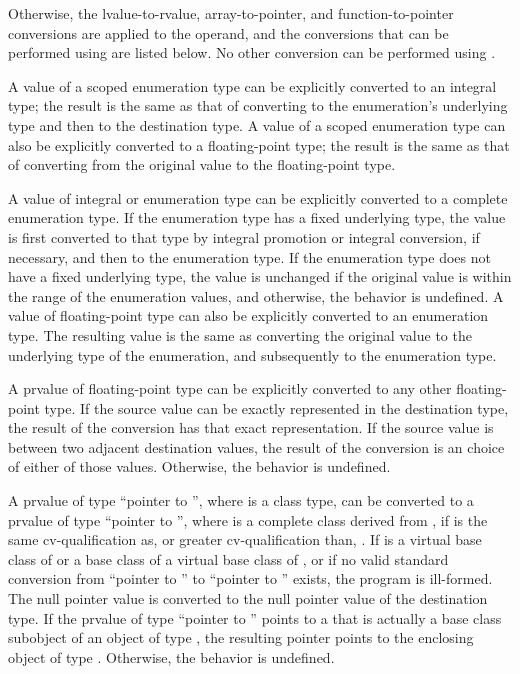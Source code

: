 \pnum
Otherwise, the lvalue-to-rvalue,
array-to-pointer, and
function-to-pointer conversions are applied to the
operand, and the conversions that can be performed using  are listed below.
No other conversion can be performed using .

\pnum
A value of a scoped enumeration type
can be explicitly converted to an integral type;
the result is the same as that of converting
to the enumeration's underlying type and then to the destination type.
A value of a scoped enumeration type
can also be explicitly converted to a floating-point type;
the result is the same as that of converting
from the original value to the floating-point type.

\pnum
{}%
%
A value of integral or enumeration type can be explicitly converted to
a complete enumeration type.
If the enumeration type has a fixed underlying type,
the value is first converted to that type
by
integral promotion or integral conversion,
if necessary, and
then to the enumeration type.
If the enumeration type does not have a fixed underlying type,
the value is unchanged
if the original value is within the range
of the enumeration values, and
otherwise, the behavior is undefined.
A value of floating-point type can also be explicitly converted to an enumeration type.
The resulting value is the same as converting the original value to the
underlying type of the enumeration, and subsequently to
the enumeration type.

\pnum
A prvalue of floating-point type can be explicitly converted to
any other floating-point type.
If the source value can be exactly represented in the destination type,
the result of the conversion has that exact representation.
If the source value is between two adjacent destination values,
the result of the conversion is
an  choice of
either of those values.
Otherwise, the behavior is undefined.

\pnum
{}%
%
A prvalue of type ``pointer to  '', where 
is a class type, can be converted to a prvalue of type ``pointer to
 '',
where  is a complete class derived
from ,
if  is the same cv-qualification as,
or greater cv-qualification than, .
If  is a virtual base class of  or
a base class of a virtual base class of , or
if no valid standard conversion from ``pointer to ''
to ``pointer to '' exists, the program is ill-formed.
The null pointer value is converted
to the null pointer value of the destination type. If the prvalue of type
``pointer to  '' points to a  that is
actually a base class subobject of an object of type , the resulting
pointer points to the enclosing object of type . Otherwise, the
behavior is undefined.

